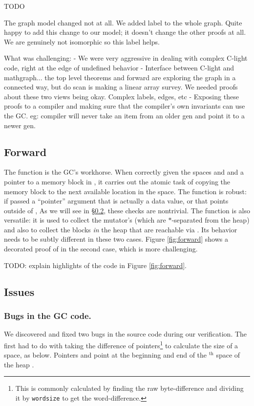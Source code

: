 \hide
{\color{red} TODO

The graph model changed not at all. We added label to the whole graph. Quite happy to add this change to our model; it doesn't change the other proofs at all. We are genuinely not isomorphic so this label helps. 

What was challenging:
	- We were very aggressive in dealing with complex C-light code, right at the edge of undefined behavior
	- Interface between C-light and mathgraph... the top level theorems and forward are exploring the graph in a connected way, but do scan is making a linear array survey. We needed proofs about these two views being okay. Complex labels, edges, etc
	- Exposing these proofs to a compiler and making sure that the compiler's own invariants can use the GC. eg: compiler will never take an item from an older gen and point it to a newer gen.
}

\subsection{Forward}
\label{sec:gcforward}
The function  is the GC's workhorse.
When correctly given the spaces  and  and a pointer 
 to a memory block in ,
it carries out the atomic task of copying the memory block to the next
available location in the  space. 
The function is robust: if passed a ``pointer'' argument 
that is actually a data value, or that points outside of 
,  
As we will see in \S\ref{sec:gcissues}, these checks are nontrivial. 
The function is also versatile: it is used to collect the 
mutator's  (which are $*$-separated from the heap) 
and also to collect the blocks \emph{in} the heap that are reachable via 
. Its behavior needs to be subtly different in these
two cases.
Figure \ref{fig:forward} shows a decorated proof of  
in the second case, which is more challenging.

TODO: explain highlights of the code in Figure \ref{fig:forward}.



\subsection{Issues} \label{sec:gcissues}

\subsubsection*{Bugs in the GC code.}
We discovered and fixed two bugs in the source code during our verification. 
The first had to do with taking the difference of pointers\footnote{This is commonly calculated by finding the 
raw byte-difference and dividing it by \texttt{\scriptsize wordsize} to get the word-difference.} 
to calculate the size of a space, as below. Pointers  and  
point at the beginning and end of the $^{\text{th}}$ space of the
heap . 

